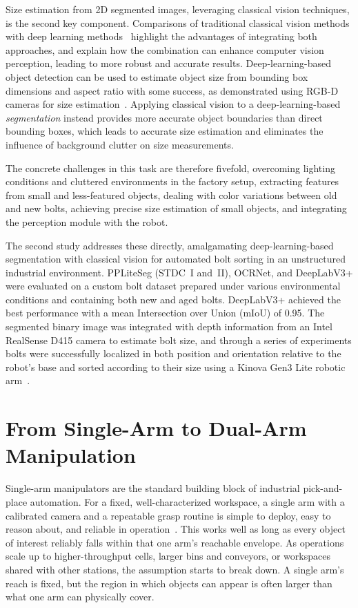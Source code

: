 Size estimation from 2D segmented images, leveraging classical vision techniques, is the second key
component. Comparisons of traditional classical vision methods with deep learning
methods~\citep{omahony2020deep} highlight the advantages of integrating both approaches, and
explain how the combination can enhance computer vision perception, leading to more robust and
accurate results. Deep-learning-based object detection can be used to estimate object size from
bounding box dimensions and aspect ratio with some success, as demonstrated using RGB-D cameras for
size estimation~\citep{wang2017tree}. Applying classical vision to a deep-learning-based
\emph{segmentation} instead provides more accurate object boundaries than direct bounding boxes,
which leads to accurate size estimation and eliminates the influence of background clutter on size
measurements.

The concrete challenges in this task are therefore fivefold, overcoming lighting conditions and
cluttered environments in the factory setup, extracting features from small and less-featured
objects, dealing with color variations between old and new bolts, achieving precise size
estimation of small objects, and integrating the perception module with the
robot.

The second study addresses these directly, amalgamating deep-learning-based segmentation with
classical vision for automated bolt sorting in an unstructured industrial environment. PPLiteSeg
(STDC~I and~II), OCRNet, and DeepLabV3+ were evaluated on a custom bolt dataset prepared under
various environmental conditions and containing both new and aged bolts. DeepLabV3+ achieved the
best performance with a mean Intersection over Union (mIoU) of 0.95. The segmented binary image was
integrated with depth information from an Intel RealSense D415 camera to estimate bolt size, and
through a series of experiments bolts were successfully localized in both position and orientation
relative to the robot's base and sorted according to their size using a Kinova Gen3 Lite robotic
arm~\citep{sk2024boltsorting}.

\section{From Single-Arm to Dual-Arm Manipulation}\label{sec:intro_dualarm}

Single-arm manipulators are the standard building block of industrial pick-and-place automation.
For a fixed, well-characterized workspace, a single arm with a calibrated camera and a repeatable
grasp routine is simple to deploy, easy to reason about, and reliable in
operation~\citep{sk2024boltsorting, corke1996visual, 6920015}. This works well as long as every object of interest reliably falls within that one arm's reachable envelope. As operations scale up to higher-throughput cells, larger bins and conveyors, or workspaces shared with other stations, the
assumption starts to break down. A single arm's reach is fixed, but the region in which objects can
appear is often larger than what one arm can physically cover.


